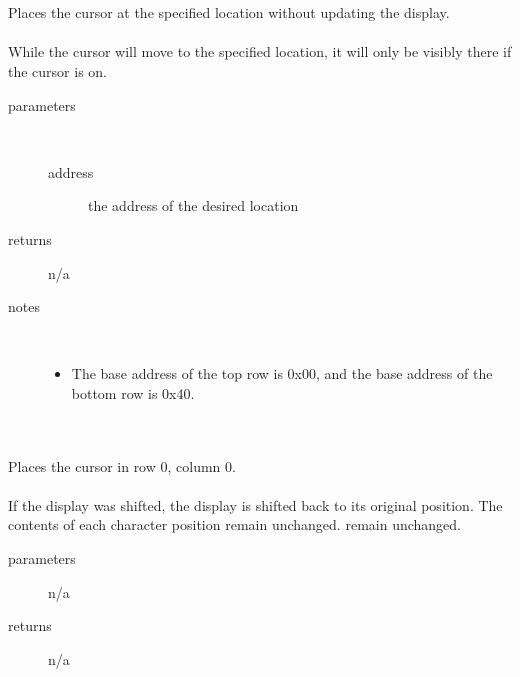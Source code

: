 \begin{itemize}
{             \\ \\
                Places the cursor at the specified location without updating the display. \\ \\
                While the cursor will move to the specified location, it will only be visibly there if the cursor is on.
                \begin{description}
                    \item[parameters] \
                    \begin{description}
                        \item[address] the address of the desired location
                    \end{description}
                    \item[returns] n/a
                    \item[notes] \
                    \begin{itemize}
                        \item The base address of the top row is 0x00, and the base address of the bottom row is 0x40.
                    \end{itemize}
                \end{description}

             \\ \\
                Places the cursor in row 0, column 0. \\ \\
                If the display was shifted, the display is shifted back to its original position.
                The contents of each character position remain unchanged.
                remain unchanged.
                \begin{description}
                    \item[parameters] n/a
                    \item[returns] n/a
                \end{description}

}
\end{itemize}
